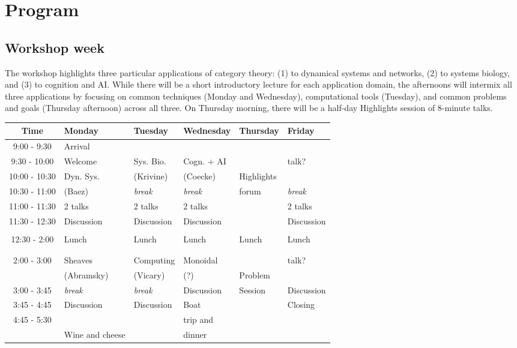 \documentclass{article}
\begin{document}
\section{Program}
\subsection{Workshop week}
The workshop highlights three particular applications of category theory: (1) to dynamical systems and networks, (2) to systems biology, and (3) to cognition and AI. While there will be a short introductory lecture for each application domain, the afternoons will intermix all three applications by focusing on common techniques (Monday and Wednesday), computational tools (Tuesday), and common problems and goals (Thursday afternoon) across all three. On Thursday morning, there will be a half-day Highlights session of 8-minute talks.

\begin{table}[h!]
\begin{center}
\begin{tabular}{|c||p{.15\linewidth}|p{.15\linewidth}|p{.15\linewidth}|p{.15\linewidth}|p{.15\linewidth}|}
\hline
Time & Monday & Tuesday & Wednesday & Thursday & Friday \\ \hline
9:00 - 9:30 & Arrival & & & & \\ \cline{2-4} \cline{6-6}
9:30 - 10:00 & Welcome & Sys. Bio. & Cogn. + AI &  & talk? \\ \cline{2-2}
10:00 - 10:30 & Dyn. Sys. & (Krivine)  & (Coecke) & Highlights & \\ \cline{3-4} \cline{6-6}
10:30 - 11:00 & (Baez) & \emph{break} & \emph{break} & forum & \emph{break} \\  \cline{2-4} \cline{6-6}
11:00 - 11:30 & 2 talks & 2 talks & 2 talks & & 2 talks \\ \cline{2-4} \cline{6-6}
11:30 - 12:30 & Discussion & Discussion & Discussion & & Discussion \\ 
&&&&& \\\hline
12:30 - 2:00 & Lunch & Lunch & Lunch & Lunch & Lunch \\
&&&&& \\
&&&&& \\ \hline
2:00 - 3:00 & Sheaves & Computing & Monoidal & & talk? \\
& (Abramsky) & (Vicary) & (?) & Problem & \\ \cline{2-4} \cline{6-6}
3:00 - 3:45 & \emph{break} & \emph{break} & Discussion & Session & Discussion \\ \cline{2-4} \cline{6-6}
3:45 - 4:45 & Discussion & Discussion & Boat & & Closing \\ 
4:45 - 5:30 & & & trip and & & \\ \cline{2-3} \cline{5-6}
& Wine and cheese & & dinner & &  \\ \hline
\end{tabular}
\end{center}
\end{table}%
\end{document}
